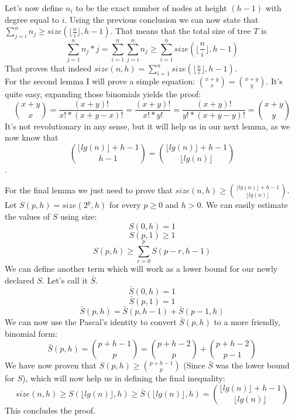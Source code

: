 \documentclass{article}
\begin{document}
Let's now define $n_{i}$ to be the exact number of nodes at height $(h-1)$ with degree equal to $i$. Using the previous conclusion we can now state that $\sum_{j=i}^{n}n_{j} \geq size(\lfloor \frac{n}{i} \rfloor, h-1)$. That means that the total size of tree $T$ is 
$$\sum_{j=1}^{n}n_{j} * j = \sum_{i=1}^{n}\sum_{j=i}^{n}n_{j} \geq \sum_{i=1}^{n}size(\lfloor \frac{n}{i} \rfloor, h-1)$$
That proves that indeed $size(n, h) = \sum_{i=1}^{n}size(\lfloor \frac{n}{i} \rfloor, h-1)$. \\

For the second lemma I will prove a simple equation: $\binom{x+y}{x} = \binom{x+y}{y}$. It's quite easy, expanding those binomials yields the proof: 
$$\binom{x+y}{x} = \frac{(x+y)!}{x! * (x+y-x)!} = \frac{(x+y)!}{x! * y!} = \frac{(x+y)!}{y! * (x+y-y)!} = \binom{x+y}{y}$$
It's not revolutionary in any sense, but it will help us in our next lemma, as we now know that 
$$\binom{\lfloor lg(n) \rfloor + h - 1}{h - 1} = \binom{\lfloor lg(n) \rfloor + h - 1}{\lfloor lg(n) \rfloor}$$.

For the final lemma we just need to prove that $size(n, h) \geq \binom{\lfloor lg(n) \rfloor + h - 1}{\lfloor lg(n) \rfloor}$. Let $S(p, h) = size(2^p, h)$ for every $p \geq 0$ and $h > 0$. We can easily estimate the values of $S$ using size:
$$S(0, h) = 1$$
$$S(p, 1) \geq 1$$
$$S(p, h) \geq \sum_{r = 0}^{p} S(p - r, h - 1)$$
We can define another term which will work as a lower bound for our newly declared $S$. Let's call it $\bar{S}$.
$$\bar{S}(0, h) = 1$$
$$\bar{S}(p, 1) = 1$$
$$\bar{S}(p, h) = \bar{S}(p, h-1) + \bar{S}(p-1, h)$$
We can now use the Pascal's identity to convert $\bar{S}(p,h)$ to a more friendly, binomial form: 
$$\bar{S}(p, h) = \binom{p+h-1}{p} = \binom{p+h-2}{p} + \binom{p+h-2}{p-1}$$
We have now proven that $S(p,h) \geq \binom{p+h-1}{p}$ (Since $\bar{S}$ was the lower bound for $S$), which will now help us in defining the final inequality: 
$$size(n, h) \geq S(\lfloor lg(n) \rfloor, h) \geq \bar{S}(\lfloor lg(n) \rfloor, h) = \binom{\lfloor lg(n) \rfloor + h - 1}{\lfloor lg(n) \rfloor}$$
This concludes the proof.
\end{document}
